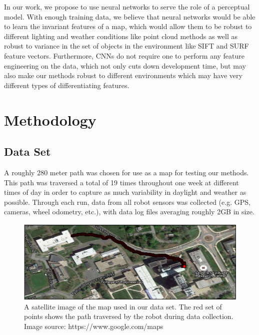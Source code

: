 \documentclass[letterpaper, 12 pt, conference]{ieeeconf}  %
\begin{document}
\par
In our work, we propose to use neural networks to serve the role of a perceptual model. With enough training data, we believe that neural networks would be able to learn the invariant features of a map, which would allow them to be robust to different lighting and weather conditions like point cloud methods as well as robust to variance in the set of objects in the environment like SIFT and SURF feature vectors. Furthermore, CNNs do not require one to perform any feature engineering on the data, which not only cuts down development time, but may also make our methods robust to different environments which may have very different types of differentiating features. 

\section{Methodology}

\subsection{Data Set}
A roughly 280 meter path was chosen for use as a map for testing our methods. This path was traversed a total of 19 times throughout one week at different times of day in order to capture as much variability in daylight and weather as possible. Through each run, data from all robot sensors was collected (e.g. GPS, cameras, wheel odometry, etc.), with data log files averaging roughly 2GB in size. 
\begin{figure}[h]
\centering
\includegraphics[scale=01.0]{map}
\caption{A satellite image of the map used in our data set. The red set of points shows the path traversed by the robot during data collection. Image source: https://www.google.com/maps}
\end{figure}
\end{document}
